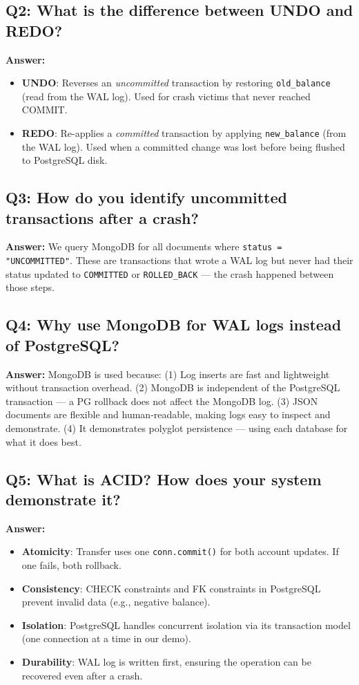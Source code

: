 \subsection{Q2: What is the difference between UNDO and REDO?}

\textbf{Answer:}
\begin{itemize}
  \item \textbf{UNDO}: Reverses an \textit{uncommitted} transaction by
        restoring \texttt{old\_balance} (read from the WAL log). Used for
        crash victims that never reached COMMIT.
  \item \textbf{REDO}: Re-applies a \textit{committed} transaction by
        applying \texttt{new\_balance} (from the WAL log). Used when a
        committed change was lost before being flushed to PostgreSQL disk.
\end{itemize}

\subsection{Q3: How do you identify uncommitted transactions after a crash?}

\textbf{Answer:} We query MongoDB for all documents where
\texttt{status = "UNCOMMITTED"}. These are transactions that wrote a WAL
log but never had their status updated to \texttt{COMMITTED} or
\texttt{ROLLED\_BACK} --- the crash happened between those steps.

\subsection{Q4: Why use MongoDB for WAL logs instead of PostgreSQL?}

\textbf{Answer:} MongoDB is used because:
(1) Log inserts are fast and lightweight without transaction overhead.
(2) MongoDB is independent of the PostgreSQL transaction --- a PG rollback
does not affect the MongoDB log.
(3) JSON documents are flexible and human-readable, making logs easy to
inspect and demonstrate.
(4) It demonstrates polyglot persistence --- using each database for what
it does best.

\subsection{Q5: What is ACID? How does your system demonstrate it?}

\textbf{Answer:}
\begin{itemize}
  \item \textbf{Atomicity}: Transfer uses one \texttt{conn.commit()} for
        both account updates. If one fails, both rollback.
  \item \textbf{Consistency}: CHECK constraints and FK constraints in
        PostgreSQL prevent invalid data (e.g., negative balance).
  \item \textbf{Isolation}: PostgreSQL handles concurrent isolation via
        its transaction model (one connection at a time in our demo).
  \item \textbf{Durability}: WAL log is written first, ensuring the
        operation can be recovered even after a crash.
\end{itemize}

